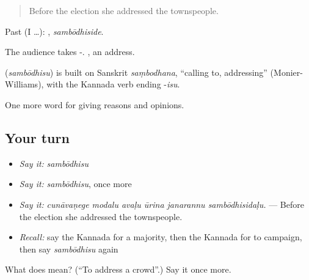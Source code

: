 \begin{quote}
Before the election she addressed the townspeople.
\end{quote}

Past (I …): , \emph{sambōdhiside}.

The audience takes -. , an address.

\begin{cousinweb}
\textbf{} (\emph{sambōdhisu}) is built on Sanskrit \emph{saṃbodhana}, \textquotedblleft{}calling to, addressing\textquotedblright{} (Monier-Williams), with the Kannada verb ending -\emph{isu}.
\end{cousinweb}

\begin{grammarlens}[title={What you've built}]
One more word for giving reasons and opinions.
\end{grammarlens}

\subsection*{Your turn}
\begin{itemize}
\raggedright
  \item \emph{Say it:} \emph{sambōdhisu}
  \item \emph{Say it:} \emph{sambōdhisu}, once more
  \item \emph{Say it:} \emph{cunāvaṇege modalu avaḷu ūrina janarannu sambōdhisidaḷu.} — Before the election she addressed the townspeople.
  \item \emph{Recall:} say the Kannada for a majority, then the Kannada for to campaign, then say \emph{sambōdhisu} again
\end{itemize}

\begin{tcolorbox}[breakable,colback=teal!4,colframe=teal!35!black,title={Before you move on}]
What does  mean? (\textquotedblleft{}To address a crowd\textquotedblright{}.) Say it once more.
\end{tcolorbox}

